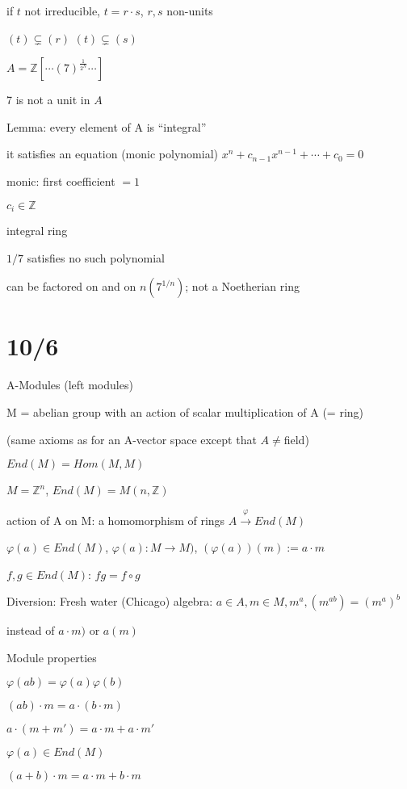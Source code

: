 \documentclass[12pt]{article}
\begin{document}
if $t$ not irreducible, $t = r \cdot s$, $r, s$ non-units

$(t) \subsetneq (r)$ $(t) \subsetneq (s)$

\noindent
$A = \mathds{Z}[\cdots (7)^{\frac{1}{2^N}} \cdots]$

7 is not a unit in $A$

\noindent
Lemma: every element of A is ``integral''

it satisfies an equation (monic polynomial) $x^n + c_{n-1}x^{n-1} + \cdots + c_0 = 0$

monic: first coefficient $= 1$

$c_i \in \mathds{Z}$

integral ring

\noindent
$1/7$ satisfies no such polynomial

 can be factored on and on $n(7^{1/n})$; not a Noetherian ring

\section{10/6}

\noindent
A-Modules (left modules)

M = abelian group with an action of scalar multiplication of A (= ring)

(same axioms as for an A-vector space except that $A \neq $field)

\noindent
$End(M) = Hom(M, M)$

$M = \mathds{Z}^n$, $End(M) = M(n, \mathds{Z})$

action of A on M: a homomorphism of rings $A \xrightarrow{\varphi} End(M)$

$\varphi(a) \in End(M)$, $\varphi(a): M \to M)$, $(\varphi(a))(m) := a \cdot m$

$f, g \in End(M)$: $fg = f \circ g$

\noindent
Diversion: Fresh water (Chicago) algebra: $a \in A, m \in M, m^a, (m^{ab}) = (m^a)^b$

instead of $a \cdot m)$ or $a(m)$

\noindent
Module properties

$\varphi(ab) = \varphi(a)\varphi(b)$

$(ab) \cdot m = a \cdot (b \cdot m)$

$a \cdot (m + m') = a \cdot m + a \cdot m'$

$\varphi(a) \in End(M)$

$(a + b) \cdot m = a \cdot m + b \cdot m$
\end{document}
